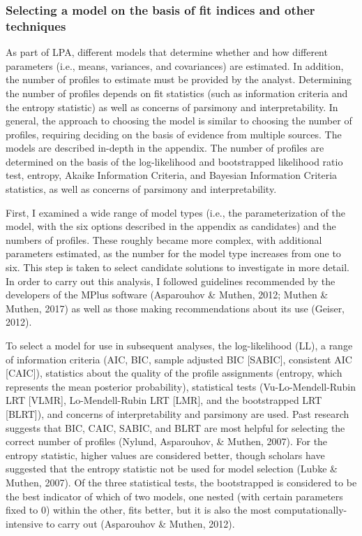 \documentclass[]{msu-thesis}
\theoremstyle{definition}
\theoremstyle{definition}
\theoremstyle{definition}
\theoremstyle{remark}
\begin{document}
\subsubsection{Selecting a model on the basis of fit indices and other
techniques}\label{selecting-a-model-on-the-basis-of-fit-indices-and-other-techniques}

As part of LPA, different models that determine whether and how
different parameters (i.e., means, variances, and covariances) are
estimated. In addition, the number of profiles to estimate must be
provided by the analyst. Determining the number of profiles depends on
fit statistics (such as information criteria and the entropy statistic)
as well as concerns of parsimony and interpretability. In general, the
approach to choosing the model is similar to choosing the number of
profiles, requiring deciding on the basis of evidence from multiple
sources. The models are described in-depth in the appendix. The number
of profiles are determined on the basis of the log-likelihood and
bootstrapped likelihood ratio test, entropy, Akaike Information
Criteria, and Bayesian Information Criteria statistics, as well as
concerns of parsimony and interpretability.

First, I examined a wide range of model types (i.e., the
parameterization of the model, with the six options described in the
appendix as candidates) and the numbers of profiles. These roughly
became more complex, with additional parameters estimated, as the number
for the model type increases from one to six. This step is taken to
select candidate solutions to investigate in more detail. In order to
carry out this analysis, I followed guidelines recommended by the
developers of the MPlus software (Asparouhov \& Muthen, 2012; Muthen \&
Muthen, 2017) as well as those making recommendations about its use
(Geiser, 2012).

To select a model for use in subsequent analyses, the log-likelihood
(LL), a range of information criteria (AIC, BIC, sample adjusted BIC
{[}SABIC{]}, consistent AIC {[}CAIC{]}), statistics about the quality of
the profile assignments (entropy, which represents the mean posterior
probability), statistical tests (Vu-Lo-Mendell-Rubin LRT {[}VLMR{]},
Lo-Mendell-Rubin LRT {[}LMR{]}, and the bootstrapped LRT {[}BLRT{]}),
and concerns of interpretability and parsimony are used. Past research
suggests that BIC, CAIC, SABIC, and BLRT are most helpful for selecting
the correct number of profiles (Nylund, Asparouhov, \& Muthen, 2007).
For the entropy statistic, higher values are considered better, though
scholars have suggested that the entropy statistic not be used for model
selection (Lubke \& Muthen, 2007). Of the three statistical tests, the
bootstrapped is considered to be the best indicator of which of two
models, one nested (with certain parameters fixed to 0) within the
other, fits better, but it is also the most computationally-intensive to
carry out (Asparouhov \& Muthen, 2012).
\end{document}
